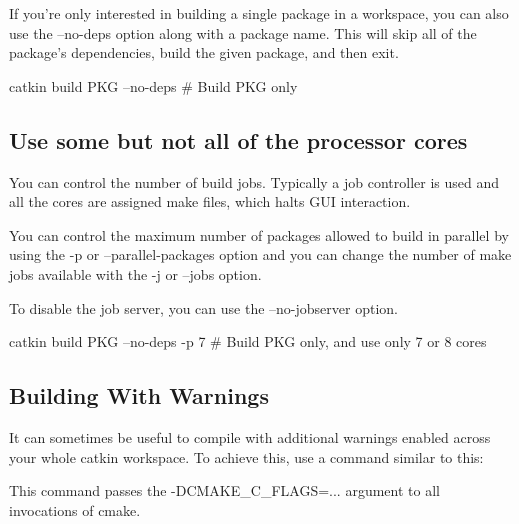 If you’re only interested in building a single package in a workspace, you can also use the --no-\/deps option along with a package name. This will skip all of the package’s dependencies, build the given package, and then exit. \begin{DoxyVerb}catkin build PKG --no-deps # Build PKG only
\end{DoxyVerb}


\subsection*{Use some but not all of the processor cores }

You can control the number of build jobs. Typically a job controller is used and all the cores are assigned make files, which halts G\-U\-I interaction.

You can control the maximum number of packages allowed to build in parallel by using the -\/p or --parallel-\/packages option and you can change the number of make jobs available with the -\/j or --jobs option.

To disable the job server, you can use the --no-\/jobserver option. \begin{DoxyVerb}catkin build PKG --no-deps -p 7 # Build PKG only, and use only 7 or 8 cores
\end{DoxyVerb}


\subsection*{Building With Warnings }

It can sometimes be useful to compile with additional warnings enabled across your whole catkin workspace. To achieve this, use a command similar to this\-: 


This command passes the {\ttfamily -\/\-D\-C\-M\-A\-K\-E\-\_\-\-C\-\_\-\-F\-L\-A\-G\-S=}... argument to all invocations of cmake. 